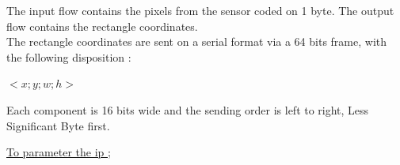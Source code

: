 \documentclass[12pt,a4paper]{article}
\begin{document}
\vspace{1cm}

The input flow contains the pixels from the sensor coded on 1 byte. The output flow contains the rectangle coordinates.\\

The rectangle coordinates are sent on a serial format via a 64 bits frame, with the following disposition :

\begin{center}
$< x; y;w; h >$\\
\end{center}

Each component is 16 bits wide and the sending order is left to right, Less Significant Byte first.\\

\vspace{1.5cm}

\underline{To parameter the ip ;}

\vspace{0.2cm}
\end{document}
